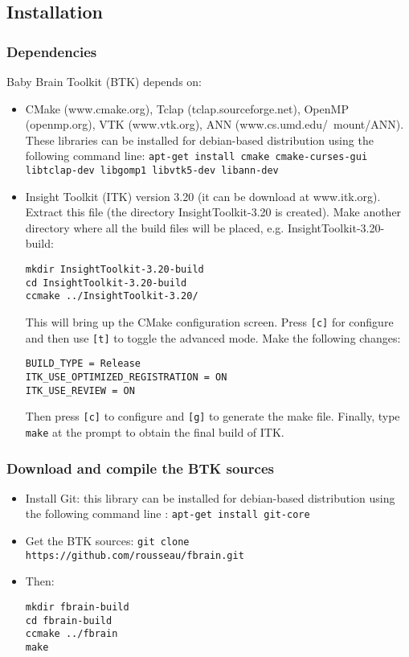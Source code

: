 \documentclass[a4paper,10pt]{article}
\begin{document}
\subsection{Installation}

\subsubsection{Dependencies}

Baby Brain Toolkit (BTK) depends on:
\begin{itemize}
 \item CMake (www.cmake.org), Tclap (tclap.sourceforge.net), OpenMP (openmp.org), VTK (www.vtk.org), ANN (www.cs.umd.edu/\string~mount/ANN). These libraries can be installed for debian-based distribution using the following command line: \texttt{apt-get install cmake cmake-curses-gui libtclap-dev libgomp1 libvtk5-dev libann-dev}
 \item Insight Toolkit (ITK) version 3.20 (it can be download at www.itk.org). Extract this file (the directory InsightToolkit-3.20 is created). Make another directory where all the build files will be placed, e.g. InsightToolkit-3.20-build:
\begin{verbatim}
mkdir InsightToolkit-3.20-build
cd InsightToolkit-3.20-build
ccmake ../InsightToolkit-3.20/
\end{verbatim}
This will bring up the CMake configuration screen. Press \texttt{[c]} for configure and then use \texttt{[t]} to toggle the advanced mode. Make the following changes:
\begin{verbatim}
BUILD_TYPE = Release
ITK_USE_OPTIMIZED_REGISTRATION = ON
ITK_USE_REVIEW = ON
\end{verbatim}
Then press \texttt{[c]} to configure and \texttt{[g]} to generate the make file. Finally, type \texttt{make} at the prompt to obtain the final build of ITK.

\end{itemize}

\subsubsection{Download and compile the BTK sources}
\begin{itemize}
 \item Install Git: this library can be installed for debian-based distribution using the following command line : \texttt{apt-get install git-core}
 \item Get the BTK sources: \texttt{git clone https://github.com/rousseau/fbrain.git }
 \item Then:
\begin{verbatim}
mkdir fbrain-build
cd fbrain-build
ccmake ../fbrain
make
\end{verbatim}
\end{itemize}
\end{document}
